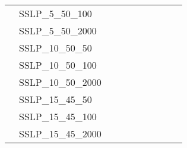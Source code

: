\begin{table}[]
{\begin{tabular}{|c|l|ll|ll|ll|l|l|}
			& SSLP\_5\_50\_100              &                                   &                                  &                           &                          &                           &                          &                                       &                                \\
			& SSLP\_5\_50\_2000             &                                   &                                  &                           &                          &                           &                          &                                       &                                \\
			& SSLP\_10\_50\_50              &                                   &                                  &                           &                          &                           &                          &                                       &                                \\
			& SSLP\_10\_50\_100             &                                   &                                  &                           &                          &                           &                          &                                       &                                \\
			& SSLP\_10\_50\_2000            &                                   &                                  &                           &                          &                           &                          &                                       &                                \\
			& SSLP\_15\_45\_50              &                                   &                                  &                           &                          &                           &                          &                                       &                                \\
			& SSLP\_15\_45\_100             &                                   &                                  &                           &                          &                           &                          &                                       &                                \\
			& SSLP\_15\_45\_2000            &                                   &                                  &                           &                          &                           &                          &                                       &                                \\ \hline

\end{tabular}}
\end{table}
